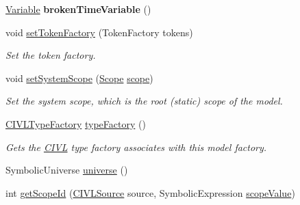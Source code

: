 \begin{DoxyCompactItemize}
\item 
\hypertarget{interfaceedu_1_1udel_1_1cis_1_1vsl_1_1civl_1_1model_1_1IF_1_1ModelFactory_ad7b82e92a2fe6efada6aa039c28fcc07}{}\hyperlink{interfaceedu_1_1udel_1_1cis_1_1vsl_1_1civl_1_1model_1_1IF_1_1variable_1_1Variable}{Variable} {\bfseries broken\+Time\+Variable} ()\label{interfaceedu_1_1udel_1_1cis_1_1vsl_1_1civl_1_1model_1_1IF_1_1ModelFactory_ad7b82e92a2fe6efada6aa039c28fcc07}

\item 
void \hyperlink{interfaceedu_1_1udel_1_1cis_1_1vsl_1_1civl_1_1model_1_1IF_1_1ModelFactory_a6c4e7d679e3e43060c5ba7d9eeaeb2de}{set\+Token\+Factory} (Token\+Factory tokens)
\begin{DoxyCompactList}\small\item\em Set the token factory. \end{DoxyCompactList}\item 
void \hyperlink{interfaceedu_1_1udel_1_1cis_1_1vsl_1_1civl_1_1model_1_1IF_1_1ModelFactory_a3883b63b54419f92b781068ebd099777}{set\+System\+Scope} (\hyperlink{interfaceedu_1_1udel_1_1cis_1_1vsl_1_1civl_1_1model_1_1IF_1_1Scope}{Scope} \hyperlink{interfaceedu_1_1udel_1_1cis_1_1vsl_1_1civl_1_1model_1_1IF_1_1ModelFactory_a0bfba3ee664b183215381de7084509db}{scope})
\begin{DoxyCompactList}\small\item\em Set the system scope, which is the root (static) scope of the model. \end{DoxyCompactList}\item 
\hyperlink{interfaceedu_1_1udel_1_1cis_1_1vsl_1_1civl_1_1model_1_1IF_1_1CIVLTypeFactory}{C\+I\+V\+L\+Type\+Factory} \hyperlink{interfaceedu_1_1udel_1_1cis_1_1vsl_1_1civl_1_1model_1_1IF_1_1ModelFactory_a5b6d941af6bbb2ceb7e9f37efc8f140a}{type\+Factory} ()
\begin{DoxyCompactList}\small\item\em Gets the \hyperlink{classedu_1_1udel_1_1cis_1_1vsl_1_1civl_1_1CIVL}{C\+I\+V\+L} type factory associates with this model factory. \end{DoxyCompactList}\item 
Symbolic\+Universe \hyperlink{interfaceedu_1_1udel_1_1cis_1_1vsl_1_1civl_1_1model_1_1IF_1_1ModelFactory_aa7dd4fa1b9e94e9108ebdd7f63848c3a}{universe} ()
\item 
int \hyperlink{interfaceedu_1_1udel_1_1cis_1_1vsl_1_1civl_1_1model_1_1IF_1_1ModelFactory_ad9c41a99de60993dff2d5cd7abad8fcc}{get\+Scope\+Id} (\hyperlink{interfaceedu_1_1udel_1_1cis_1_1vsl_1_1civl_1_1model_1_1IF_1_1CIVLSource}{C\+I\+V\+L\+Source} source, Symbolic\+Expression \hyperlink{interfaceedu_1_1udel_1_1cis_1_1vsl_1_1civl_1_1model_1_1IF_1_1ModelFactory_a14d322afed3a086d466b7712a9dec0b2}{scope\+Value})

\end{DoxyCompactItemize}
